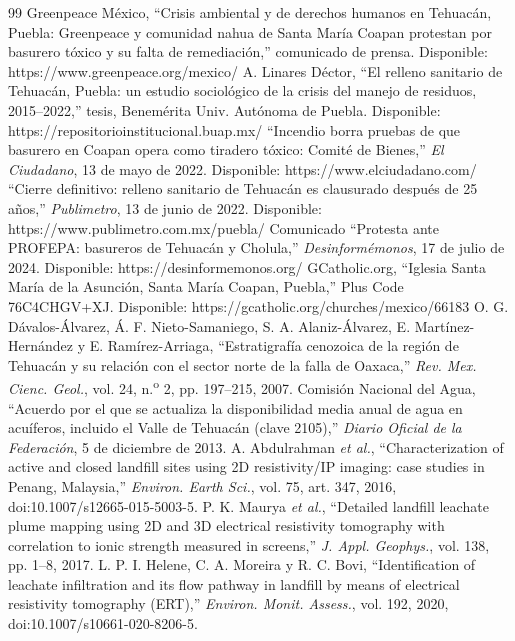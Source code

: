 \begin{thebibliography}{99}
 Greenpeace México, ``Crisis ambiental y de derechos humanos en Tehuacán, Puebla: Greenpeace y comunidad nahua de Santa María Coapan protestan por basurero tóxico y su falta de remediación,'' comunicado de prensa. Disponible: https://www.greenpeace.org/mexico/
 A. Linares Déctor, ``El relleno sanitario de Tehuacán, Puebla: un estudio sociológico de la crisis del manejo de residuos, 2015--2022,'' tesis, Benemérita Univ. Autónoma de Puebla. Disponible: https://repositorioinstitucional.buap.mx/
 ``Incendio borra pruebas de que basurero en Coapan opera como tiradero tóxico: Comité de Bienes,'' \textit{El Ciudadano}, 13 de mayo de 2022. Disponible: https://www.elciudadano.com/
 ``Cierre definitivo: relleno sanitario de Tehuacán es clausurado después de 25 años,'' \textit{Publimetro}, 13 de junio de 2022. Disponible: https://www.publimetro.com.mx/puebla/
 Comunicado ``Protesta ante PROFEPA: basureros de Tehuacán y Cholula,'' \textit{Desinformémonos}, 17 de julio de 2024. Disponible: https://desinformemonos.org/
 GCatholic.org, ``Iglesia Santa María de la Asunción, Santa María Coapan, Puebla,'' Plus Code 76C4CHGV+XJ. Disponible: https://gcatholic.org/churches/mexico/66183
 O. G. Dávalos-Álvarez, Á. F. Nieto-Samaniego, S. A. Alaniz-Álvarez, E. Martínez-Hernández y E. Ramírez-Arriaga, ``Estratigrafía cenozoica de la región de Tehuacán y su relación con el sector norte de la falla de Oaxaca,'' \textit{Rev. Mex. Cienc. Geol.}, vol. 24, n.\textsuperscript{o} 2, pp. 197--215, 2007.
 Comisión Nacional del Agua, ``Acuerdo por el que se actualiza la disponibilidad media anual de agua en acuíferos, incluido el Valle de Tehuacán (clave 2105),'' \textit{Diario Oficial de la Federación}, 5 de diciembre de 2013.
 A. Abdulrahman \textit{et al.}, ``Characterization of active and closed landfill sites using 2D resistivity/IP imaging: case studies in Penang, Malaysia,'' \textit{Environ. Earth Sci.}, vol. 75, art. 347, 2016, doi:10.1007/s12665-015-5003-5.
 P. K. Maurya \textit{et al.}, ``Detailed landfill leachate plume mapping using 2D and 3D electrical resistivity tomography with correlation to ionic strength measured in screens,'' \textit{J. Appl. Geophys.}, vol. 138, pp. 1--8, 2017.
 L. P. I. Helene, C. A. Moreira y R. C. Bovi, ``Identification of leachate infiltration and its flow pathway in landfill by means of electrical resistivity tomography (ERT),'' \textit{Environ. Monit. Assess.}, vol. 192, 2020, doi:10.1007/s10661-020-8206-5.

\end{thebibliography}
